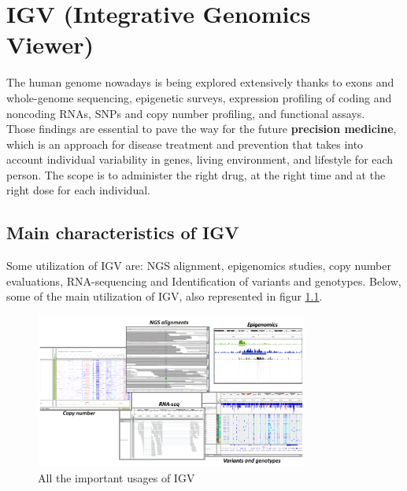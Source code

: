 \graphicspath{{chapters/IGVImages/}}

\chapter{IGV (Integrative Genomics Viewer)} \label{chap: IGV}
The human genome nowadays is being explored extensively thanks to exons and
whole-genome sequencing, epigenetic surveys, expression profiling of coding and noncoding RNAs, SNPs and copy number profiling, and functional assays.\\
Those findings are essential to pave the way for the future \textbf{precision medicine}, which is an approach for disease treatment and prevention that takes into account individual variability in genes, living environment, and lifestyle for each person. The scope is to administer the right drug, at the right time and at the right dose for each individual. 

\section{Main characteristics of IGV}
Some utilization of IGV are: NGS alignment, epigenomics studies, copy number evaluations, RNA-sequencing and Identification of variants and genotypes.
Below, some of the main utilization of IGV, also represented in figur \ref{fig:IGVusages}.

\begin{figure}[H]
    \centering
    \includegraphics[width=0.8\textwidth]{usagesIGV.PNG}
    \caption{All the important usages of IGV}
    \label{fig:IGVusages}
\end{figure}

